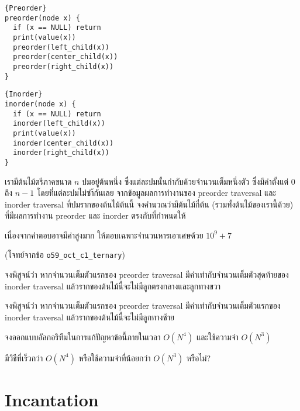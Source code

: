 \noindent\begin{minipage}{.48\textwidth}
\begin{lstlisting}[caption=Preorder]{Preorder}
preorder(node x) {
  if (x == NULL) return
  print(value(x))
  preorder(left_child(x))
  preorder(center_child(x))
  preorder(right_child(x))
}
\end{lstlisting}
\end{minipage}\hfill
\begin{minipage}{.48\textwidth}
\begin{lstlisting}[caption=Inorder]{Inorder}
inorder(node x) {
  if (x == NULL) return
  inorder(left_child(x))
  print(value(x))
  inorder(center_child(x))
  inorder(right_child(x))
}
\end{lstlisting}
\end{minipage}

เรามีต้นไม้ตรีภาคขนาด $n$ ปมอยู่ต้นหนึ่ง ซึ่งแต่ละปมนั้นกำกับด้วยจำนวนเต็มหนึ่งตัว ซึ่งมีค่าตั้งแต่ $0$ ถึง $n-1$  โดยที่แต่ละปมไม่ซำ้กันเลย จากข้อมูลผลการทำงานของ preorder traversal และ inorder traversal ที่ปมรากของต้นไม้ต้นนี้ จงคำนวณว่ามีต้นไม้กี่ต้น (รวมทั้งต้นไม้ของเรานี้ด้วย) ที่มีผลการทำงาน preorder และ inorder ตรงกับที่กำหนดให้

เนื่องจากคำตอบอาจมีค่าสูงมาก ให้ตอบเฉพาะจำนวนหารเอาเศษด้วย $10^9+7$

(โจทย์จากข้อ \texttt{o59\_oct\_c1\_ternary})

\begin{exercise}
จงพิสูจน์ว่า หากจำนวนเต็มตัวแรกของ preorder traversal มีค่าเท่ากับจำนวนเต็มตัวสุดท้ายของ inorder traversal แล้วรากของต้นไม้นี้จะไม่มีลูกตรงกลางและลูกทางขวา
\end{exercise}

\begin{exercise}
จงพิสูจน์ว่า หากจำนวนเต็มตัวแรกของ preorder traversal มีค่าเท่ากับจำนวนเต็มตัวแรกของ inorder traversal แล้วรากของต้นไม้นี้จะไม่มีลูกทางซ้าย
\end{exercise}

\begin{exercise}
จงออกแบบอัลกอริทึมในการแก้ปัญหาข้อนี้ภายในเวลา $O(N^4)$ และใช้ความจำ $O(N^3)$
\end{exercise}

\begin{bonus}
มีวิธีที่เร็วกว่า $O(N^4)$ หรือใช้ความจำที่น้อยกว่า $O(N^3)$ หรือไม่?
\end{bonus}

\section{Incantation}
\label{ipst:o60_oct_c2_incantation}

